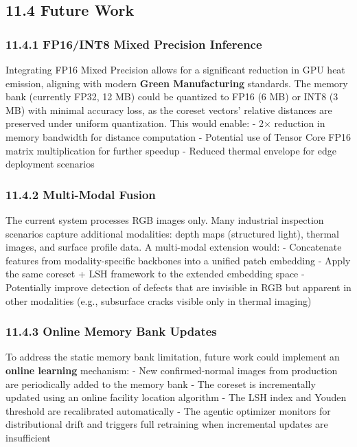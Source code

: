 \documentclass[12pt, a4paper, oneside]{report}
\begin{document}
\subsection{11.4 Future Work}\label{future-work}

\subsubsection{11.4.1 FP16/INT8 Mixed Precision Inference}\label{fp16int8-mixed-precision-inference}

Integrating FP16 Mixed Precision allows for a significant reduction in GPU heat emission, aligning with modern \textbf{Green Manufacturing} standards. The memory bank (currently FP32, 12 MB) could be quantized to FP16 (6 MB) or INT8 (3 MB) with minimal accuracy loss, as the coreset vectors' relative distances are preserved under uniform quantization. This would enable: - 2$\times$ reduction in memory bandwidth for distance computation - Potential use of Tensor Core FP16 matrix multiplication for further speedup - Reduced thermal envelope for edge deployment scenarios

\subsubsection{11.4.2 Multi-Modal Fusion}\label{multi-modal-fusion}

The current system processes RGB images only. Many industrial inspection scenarios capture additional modalities: depth maps (structured light), thermal images, and surface profile data. A multi-modal extension would: - Concatenate features from modality-specific backbones into a unified patch embedding - Apply the same coreset + LSH framework to the extended embedding space - Potentially improve detection of defects that are invisible in RGB but apparent in other modalities (e.g., subsurface cracks visible only in thermal imaging)

\subsubsection{11.4.3 Online Memory Bank Updates}\label{online-memory-bank-updates}

To address the static memory bank limitation, future work could implement an \textbf{online learning} mechanism: - New confirmed-normal images from production are periodically added to the memory bank - The coreset is incrementally updated using an online facility location algorithm - The LSH index and Youden threshold are recalibrated automatically - The agentic optimizer monitors for distributional drift and triggers full retraining when incremental updates are insufficient
\end{document}
